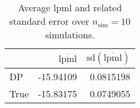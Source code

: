 \begin{table}[H]

\caption{Average lpml and related standard error over $n_{\text{sim}} = 10$ simulations.}
\centering
\begin{tabular}[t]{lrr}
\toprule
  & $\overbar{\text{lpml}}$ & $\text{sd}(\overbar{\text{lpml}})$\\
\midrule
DP & -15.94109 & 0.0815198\\
True & -15.83175 & 0.0749055\\
\bottomrule
\end{tabular}
\end{table}